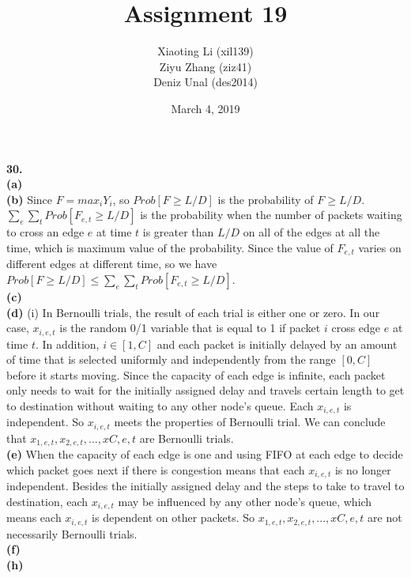 \documentclass{article}
\title{Assignment 19}
\author{Xiaoting Li (xil139) \\
Ziyu Zhang (ziz41) \\
Deniz Unal (des2014)}
\date{March 4, 2019}
\begin{document}
\maketitle

\noindent
\textbf{30.} \\ \newline
\textbf{(a)} \\ \newline
\textbf{(b)} Since $F = max_iY_i$, so $Prob[F \geq L/D]$ is the probability of $F \geq L/D$. $\sum_e\sum_tProb[F_{e,t} \geq L/D]$ is the probability when the number of packets waiting to cross an edge $e$ at time $t$ is greater than $L/D$ on all of the edges at all the time, which is maximum value of the probability. Since the value of $F_{e,t}$ varies on different edges at different time, so we have $Prob[F \geq L/D] \leq \sum_e\sum_tProb[F_{e,t} \geq L/D]$.\\ \newline
\textbf{(c)}\\ \newline
\textbf{(d)} (i) In Bernoulli trials, the result of each trial is either one or zero. In our case, $x_{i,e,t}$ is the random 0/1 variable that is equal to 1 if packet $i$ cross edge $e
$ at time $t$. In addition, $i\in [1, C]$ and each packet is initially delayed by an amount of time that is selected uniformly and independently from the range $[0,C]$ before it starts moving. Since the capacity of each edge is infinite, each packet only needs to wait for the initially assigned delay and travels certain length to get to destination without waiting to any other node's queue. Each $x_{i,e,t}$ is independent. So $x_{i,e,t}$ meets the properties of Bernoulli trial. We can conclude that $x_{1,e,t}, x_{2,e,t}, ... , x{C,e,t}$ are Bernoulli trials.\\ \newline
\textbf{(e)} When the capacity of each edge is one and using FIFO at each edge to decide which packet goes next if there is congestion means that each $x_{i,e,t}$ is no longer independent. Besides the initially assigned delay and the steps to take to travel to destination, each $x_{i,e,t}$ may be influenced by any other node's queue, which means each $x_{i,e,t}$ is dependent on other packets. So $x_{1,e,t}, x_{2,e,t}, ... , x{C,e,t}$ are not necessarily Bernoulli trials.\\ \newline
\textbf{(f)} \\ \newline
\textbf{(h)} \\ \newline
\end{document}
